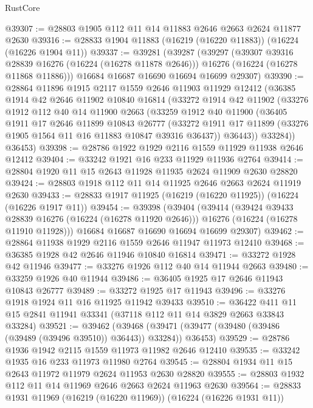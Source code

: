 \begin{lexlean}{RustCore}
\begin{coremodule}
@39307 := @28803 @1905 @112 @11 @14 @11883 @2646 @2663 @2624 @11877 @2630
@39316 := @28833 @1904 @11883 (@16219 (@16220 @11883)) (@16224 (@16226 @1904 @11))
@39337 := @39281
    (@39287
      (@39297
        (@39307 @39316 @28839 @16276 (@16224 (@16278 @11878 @2646)))
        @16276
        (@16224 (@16278 @11868 @11886)))
      @16684
      @16687
      @16690
      @16694
      @16699
      @29307)
@39390 := @28864
    @11896
    @1915
    @2117
    @1559
    @2646
    @11903
    @11929
    @12412
    (@36385
      @1914
      @42
      @2646
      @11902
      @10840
      @16814
      (@33272
        @1914
        @42
        @11902
        (@33276
          @1912
          @112
          @40
          @14
          @11900
          @2663
          (@33259
            @1912
            @40
            @11900
            (@36405
              @1911
              @17
              @2646
              @11899
              @10843
              @26777
              (@33272 @1911 @17 @11899 (@33276 @1905 @1564 @11 @16 @11883 @10847 @39316 @36437))
              @36443))
          @33284))
      @36453)
@39398 := @28786 @1922 @1929 @2116 @1559 @11929 @11938 @2646 @12412
@39404 := @33242 @1921 @16 @233 @11929 @11936 @2764
@39414 := @28804 @1920 @11 @15 @2643 @11928 @11935 @2624 @11909 @2630 @28820
@39424 := @28803 @1918 @112 @11 @14 @11925 @2646 @2663 @2624 @11919 @2630
@39433 := @28833 @1917 @11925 (@16219 (@16220 @11925)) (@16224 (@16226 @1917 @11))
@39454 := @39398
    (@39404
      (@39414
        (@39424 @39433 @28839 @16276 (@16224 (@16278 @11920 @2646)))
        @16276
        (@16224 (@16278 @11910 @11928)))
      @16684
      @16687
      @16690
      @16694
      @16699
      @29307)
@39462 := @28864 @11938 @1929 @2116 @1559 @2646 @11947 @11973 @12410
@39468 := @36385 @1928 @42 @2646 @11946 @10840 @16814
@39471 := @33272 @1928 @42 @11946
@39477 := @33276 @1926 @112 @40 @14 @11944 @2663
@39480 := @33259 @1926 @40 @11944
@39486 := @36405 @1925 @17 @2646 @11943 @10843 @26777
@39489 := @33272 @1925 @17 @11943
@39496 := @33276 @1918 @1924 @11 @16 @11925 @11942 @39433
@39510 := @36422 @411 @11 @15 @2841 @11941 @33341 (@37118 @112 @11 @14 @3829 @2663 @33843 @33284)
@39521 := @39462
    (@39468 (@39471 (@39477 (@39480 (@39486 (@39489 (@39496 @39510)) @36443)) @33284)) @36453)
@39529 := @28786 @1936 @1942 @2115 @1559 @11973 @11982 @2646 @12410
@39535 := @33242 @1935 @16 @233 @11973 @11980 @2764
@39545 := @28804 @1934 @11 @15 @2643 @11972 @11979 @2624 @11953 @2630 @28820
@39555 := @28803 @1932 @112 @11 @14 @11969 @2646 @2663 @2624 @11963 @2630
@39564 := @28833 @1931 @11969 (@16219 (@16220 @11969)) (@16224 (@16226 @1931 @11))

\end{coremodule}
\end{lexlean}
